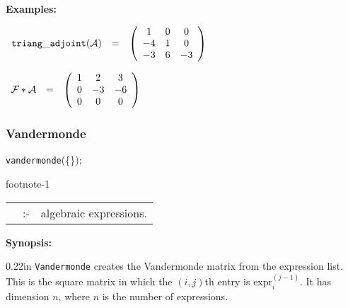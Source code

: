 {\bf Examples:}

\begin{flushleft}
\hspace*{0.1in}
\begin{math}
\begin{array}{ccc}
{\tt triang\_adjoint}(\mathcal{A}) & = &
\left( \begin{array}{ccc} 1 & 0 & 0 \\ -4 & 1 & 0 \\ -3 & 6 & -3
\end{array} \right)
\end{array}
\end{math}
\end{flushleft}

\vspace*{0.1in}

\begin{flushleft}
\hspace*{0.1in}
\begin{math}
\begin{array}{ccc}
{\cal F} * \mathcal{A} & = &
\left( \begin{array}{ccc} 1 & 2 & 3 \\ 0 & -3 & -6 \\ 0 & 0 & 0
\end{array} \right)
\end{array}
\end{math}
\end{flushleft}

\subsubsection{Vandermonde}
\label{linalg:Vandermonde}

\hspace*{0.175in} {\tt vandermonde}(\{\exprlist{}\}); \addtocounter
{footnote}{-1}\footnotemark

\hspace*{0.1in} 
\begin{tabular}{l l l}
\exprlist{} &:-& algebraic expressions.
\end{tabular}

{\bf Synopsis:} %

\begin{addtolength}{\leftskip}{0.22in}
  {\tt Vandermonde} creates the Vandermonde matrix from the expression list.
  This is the square matrix in which the $(i,j)$th entry is $\text{expr}_i^{(j-1)}$.
  It has dimension $n$, where $n$ is the number of expressions.
\end{addtolength}

